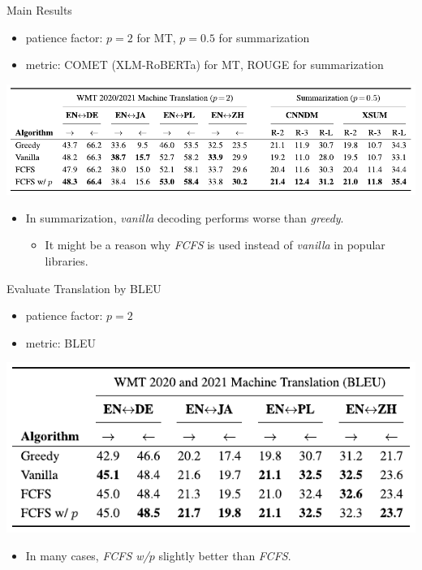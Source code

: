 \documentclass[t, unicode, 12pt, xdvipdfmx, aspectratio=169, bxjsarticle]{beamer}
\begin{document}
\begin{frame}[label={sec:org2794efc}]{Main Results}
\vspace{-0.3cm}
\begin{itemize}
\item patience factor: \(p = 2\) for MT, \(p = 0.5\) for summarization
\item metric: COMET (XLM-RoBERTa) for MT, ROUGE for summarization
\end{itemize}
\vspace{-0.1cm}
\begin{center}
\includegraphics[width=0.9\linewidth]{./figure/main_results.pdf}
\end{center}
\vspace{-0.2cm}
\begin{itemize}
\item In summarization, \textit{vanilla} decoding performs worse than \textit{greedy}.
\begin{itemize}
\item It might be a reason why \textit{FCFS} is used instead of \textit{vanilla} in popular libraries.
\end{itemize}
\end{itemize}
\end{frame}

\begin{frame}[label={sec:orgb61dfc7}]{Evaluate Translation by BLEU}
\begin{itemize}
\item patience factor: \(p=2\)
\item metric: BLEU
\end{itemize}
\begin{center}
\includegraphics[width=0.75\linewidth]{./figure/mt_bleu.pdf}
\end{center}

\begin{itemize}
\item In many cases, \textit{FCFS w/$p$} slightly better than \textit{FCFS}.
\end{itemize}
\end{frame}
\end{document}
